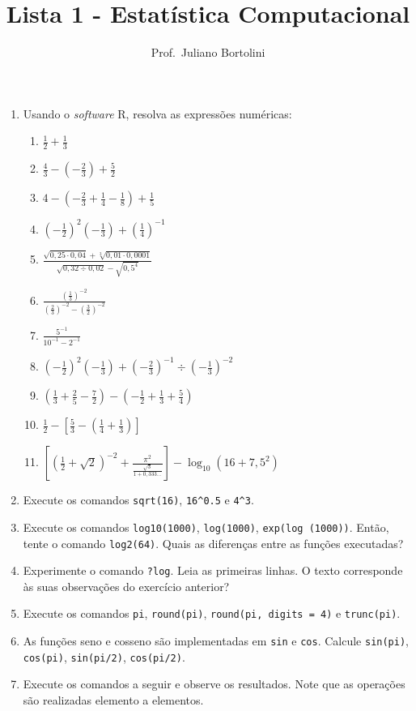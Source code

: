 \documentclass[
]{article}
\title{Lista 1 - Estatística Computacional}
\author{Prof.~Juliano Bortolini}
\date{}
\providecommand{\tightlist}{%
  \setlength{\itemsep}{0pt}\setlength{\parskip}{0pt}}
\begin{document}
\maketitle

\begin{enumerate}
\def\labelenumi{\arabic{enumi}.}
\item
  Usando o \emph{software} R, resolva as expressões numéricas:

  \begin{enumerate}
  \def\labelenumii{\alph{enumii}.}
  \tightlist
  \item
    \(\frac{1}{2} + \frac{1}{3}\)
  \item
    \(\frac{4}{3} - \left(- \frac{2}{3} \right) + \frac{5}{2}\)
  \item
    \(4 - \left( - \frac{2}{3} + \frac{1}{4} - \frac{1}{8} \right) + \frac{1}{5}\)
  \item
    \(\left( - \frac{1}{2}\right)^2 \left( - \frac{1}{3}\right) + \left( \frac{1}{4}\right)^{-1}\)
  \item
    \(\frac{\sqrt{0,25 \cdot 0,04} + \sqrt[3]{0,01 \cdot 0,0001}}{\sqrt{0,32 \div 0,02} - \sqrt{0,5^4}}\)
  \item
    \(\frac{\left(\frac{1}{3}\right)^{-2}}{\left(\frac{2}{3}\right)^{-2} - \left(\frac{3}{2}\right)^{-2}}\)
  \item
    \(\frac{5^{-1}}{10^{-1} - 2^{-1}}\)
  \item
    \(\left(-\frac{1}{2} \right)^2 \left(-\frac{1}{3} \right) + \left(-\frac{2}{3} \right)^{-1} \div \left(-\frac{1}{3} \right)^{-2}\)
  \item
    \(\left( \frac{1}{3} + \frac{2}{5} - \frac{7}{2}\right) - \left( -\frac{1}{2} + \frac{1}{3} + \frac{5}{4}\right)\)
  \item
    \(\frac{1}{2} - \left[ \frac{5}{3} - \left( \frac{1}{4} + \frac{1}{3}\right) \right]\)
  \item
    \(\left[\left(\frac{1}{2} + \sqrt{2}\right)^{-2} + \frac{\pi^2}{\frac{\sqrt{3}}{1 + 0,333...}}\right] - \log_{10}(16 + 7,5^2)\)
  \end{enumerate}
\item
  Execute os comandos \texttt{sqrt(16)}, \texttt{16\^{}0.5} e
  \texttt{4\^{}3}.
\item
  Execute os comandos \texttt{log10(1000)}, \texttt{log(1000)},
  \texttt{exp(log\ (1000))}. Então, tente o comando \texttt{log2(64)}.
  Quais as diferenças entre as funções executadas?
\item
  Experimente o comando \texttt{?log}. Leia as primeiras linhas. O texto
  corresponde às suas observações do exercício anterior?
\item
  Execute os comandos \texttt{pi}, \texttt{round(pi)},
  \texttt{round(pi,\ digits\ =\ 4)} e \texttt{trunc(pi)}.
\item
  As funções seno e cosseno são implementadas em \texttt{sin} e
  \texttt{cos}. Calcule \texttt{sin(pi)}, \texttt{cos(pi)},
  \texttt{sin(pi/2)}, \texttt{cos(pi/2)}.
\item
  Execute os comandos a seguir e observe os resultados. Note que as
  operações são realizadas elemento a elementos.
\end{enumerate}
\end{document}
